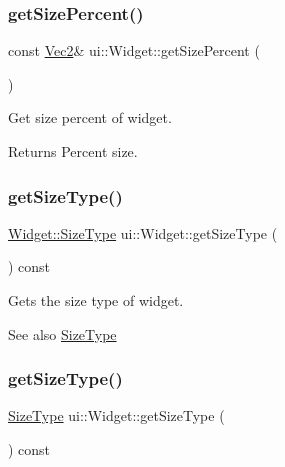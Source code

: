 \subsubsection{\texorpdfstring{get\+Size\+Percent()}{getSizePercent()}\hspace{0.1cm}{\footnotesize\ttfamily [2/2]}}
{\footnotesize\ttfamily const \hyperlink{classVec2}{Vec2}\& ui\+::\+Widget\+::get\+Size\+Percent (\begin{DoxyParamCaption}{ }\end{DoxyParamCaption})}

Get size percent of widget.

\begin{DoxyReturn}{Returns}
Percent size. 
\end{DoxyReturn}
\mbox{\label{classui_1_1Widget_a1a8759b49fc2330ab8b106d887914474}} 
\subsubsection{\texorpdfstring{get\+Size\+Type()}{getSizeType()}\hspace{0.1cm}{\footnotesize\ttfamily [1/2]}}
{\footnotesize\ttfamily \hyperlink{classui_1_1Widget_ab7035fc10a00c756523be6bc57cf801c}{Widget\+::\+Size\+Type} ui\+::\+Widget\+::get\+Size\+Type (\begin{DoxyParamCaption}{ }\end{DoxyParamCaption}) const}

Gets the size type of widget.

\begin{DoxySeeAlso}{See also}
{\ttfamily \hyperlink{classui_1_1Widget_ab7035fc10a00c756523be6bc57cf801c}{Size\+Type}} 
\end{DoxySeeAlso}
\mbox{\label{classui_1_1Widget_a00e0c3f1c0debdf4ed6003b77a000399}} 
\subsubsection{\texorpdfstring{get\+Size\+Type()}{getSizeType()}\hspace{0.1cm}{\footnotesize\ttfamily [2/2]}}
{\footnotesize\ttfamily \hyperlink{classui_1_1Widget_ab7035fc10a00c756523be6bc57cf801c}{Size\+Type} ui\+::\+Widget\+::get\+Size\+Type (\begin{DoxyParamCaption}{ }\end{DoxyParamCaption}) const}


